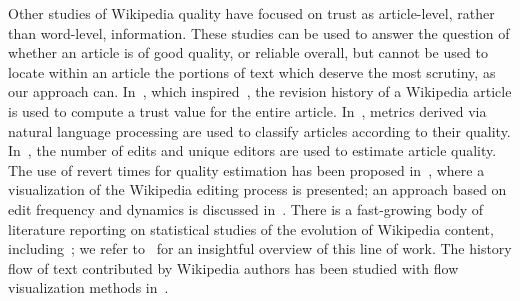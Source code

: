 Other studies of Wikipedia quality have focused on trust as
article-level, rather than word-level, information.
These studies can be used to answer the question of whether an
article is of good quality, or reliable overall, but cannot be used to
locate within an article the portions of text which deserve the most
scrutiny, as our approach can.
In~\cite{WikiTrust06}, which inspired~\cite{McGuinness06}, the
revision history of a Wikipedia article is used to compute a trust
value for the entire article.
In~\cite{Emigh05b,Mingus07}, metrics derived via natural language processing
are used to classify articles according to their quality.
In~\cite{Lih04}, the number of edits and unique editors are used to
estimate article quality.
The use of revert times for quality estimation has been proposed
in~\cite{Viegas04}, where a visualization of the Wikipedia editing
process is presented; an approach based on edit frequency and dynamics
is discussed in~\cite{WilkinsonHuberman07}.
There is a fast-growing body of literature reporting on
statistical studies of the evolution of Wikipedia content,
including~\cite{Viegas04,Voss05,Ortega07}; we refer to~\cite{Ortega07} for an
insightful overview of this line of work.
The history flow of text contributed by Wikipedia authors has
been studied with flow visualization methods in~\cite{Viegas04}.


